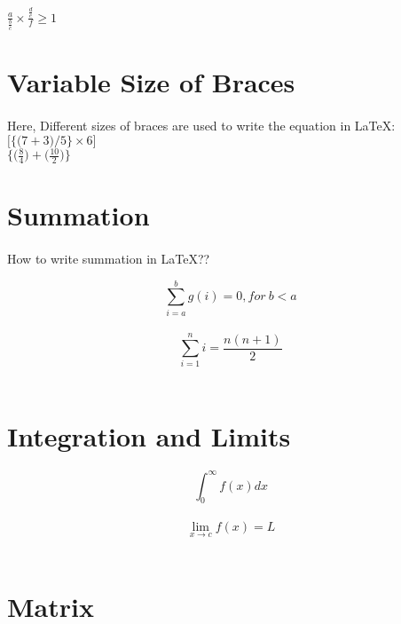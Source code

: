 \documentclass[12pt]{article}
\begin{document}
	$\frac{a}{\frac{b}{c}} \times \frac{\frac{d}{e}}{f} \geq 1$
	
	\section{Variable Size of Braces}
	
	
	\paragraph{}
	
	Here, Different sizes of braces are used to write the equation in LaTeX: \\
	
	$ \bigg[\Big\{\big(7+3\big)/5 \Big\} \times 6 \bigg]$ \\[12pt]
	
	
	$\bigg\{\Big(\frac{8}{4} \Big) + \Big(\frac{10}{2}\Big)\bigg\}$ \\
		
	\section{Summation}
	
	\paragraph{}
	
	How to write summation in LaTeX??
	
	\[\sum_{i=a}^{b}g(i) = 0, {for} \ b < a\] \\
	
	\[\sum_{i=1}^{n}i = \frac{n(n+1)}{2}\] \\
	
	\section{Integration and Limits}
	
	\[\int_{0}^{\infty}f(x)dx\] \\
	
	\[\lim_{x \to c} f(x) = L\]  \\
	
	\newpage
	
	\section{Matrix}
	
\end{document}
